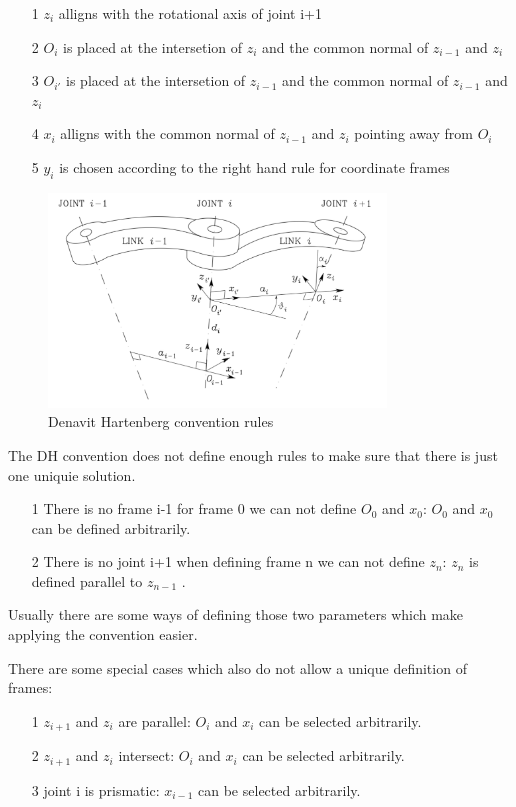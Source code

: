 \documentclass{tpk4170report}
\begin{document}
\begin{itemize}
  \item[1] \(z_{i}\) alligns with the rotational axis of joint i+1
  \item[2] \(O_{i}\) is placed at the intersetion of \(z_{i}\) and the common normal of \(z_{i-1}\) and \(z_{i}\) 
  \item[3] \(O_{i'}\) is placed at the intersetion of \(z_{i-1}\) and the common normal of \(z_{i-1}\) and \(z_{i}\)
  \item[4] \(x_{i}\) alligns with the common normal of \(z_{i-1}\) and \(z_{i}\) pointing away from \(O_{i}\)
  \item[5] \(y_{i}\) is chosen according to the right hand rule for coordinate frames
  \end{itemize}
\begin{figure}
  \centering
  \includegraphics[width=0.8\textwidth]{assets/Denavit_Hartenberg_Convention_Rules.pdf} 
  \caption{Denavit Hartenberg convention rules \cite{Siciliano2009}}
  \label{fig:Denavit_Hartenberg_Konvention_Rules}
\end{figure}

The DH convention does not define enough rules to make sure that there is just one uniquie solution. 

\begin{itemize}
  \item[1] There is no frame i-1 for frame 0 we can not define \(O_{0}\) and \(x_{0}\):  \(O_{0}\) and \(x_{0}\) can be defined arbitrarily.
  \item[2] There is no joint i+1 when defining frame n we can not define \(z_{n}\): \(z_{n}\) is defined parallel to \(z_{n-1}\) . 
\end{itemize}  Usually there are some ways of defining those two parameters which make applying the convention easier.

There are some special cases which also do not allow a unique definition of frames:
\begin{itemize}
  \item[1] \(z_{i+1}\) and \(z_{i}\) are parallel: \(O_{i}\) and \(x_{i}\) can be selected arbitrarily.
  \item[2] \(z_{i+1}\) and \(z_{i}\) intersect: \(O_{i}\) and \(x_{i}\) can be selected arbitrarily.
  \item[3] joint i is prismatic: \(x_{i-1}\) can be selected arbitrarily.
\end{itemize}
\end{document}
